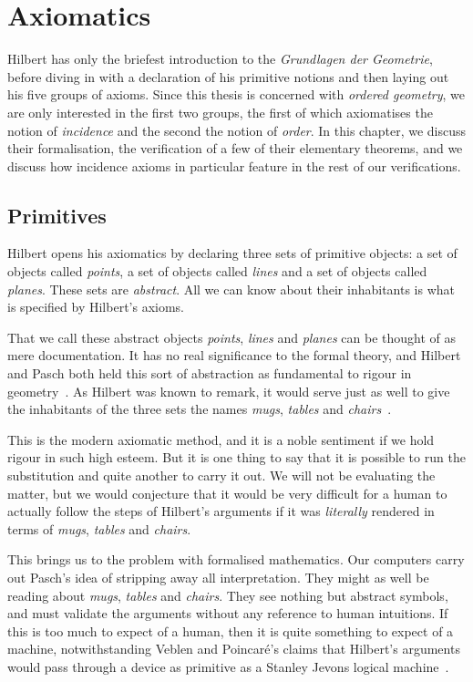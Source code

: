 \chapter{Axiomatics}\label{chapter:Axiomatics}
Hilbert has only the briefest introduction to the \emph{Grundlagen der Geometrie}, before diving in with a declaration of his primitive notions and then laying out his five groups of axioms. Since this thesis is concerned with \emph{ordered geometry}, we are only interested in the first two groups, the first of which axiomatises the notion of \emph{incidence} and the second the notion of \emph{order}. In this chapter, we discuss their formalisation, the verification of a few of their elementary theorems, and we discuss how incidence axioms in particular feature in the rest of our verifications.

\section{Primitives}
Hilbert opens his axiomatics by declaring three sets of primitive objects: a set of objects called \emph{points}, a set of objects called \emph{lines} and a set of objects called \emph{planes}. These sets are \emph{abstract}. All we can know about their inhabitants is what is specified by Hilbert's axioms.

That we call these abstract objects \emph{points}, \emph{lines} and \emph{planes} can be thought of as mere documentation. It has no real significance to the formal theory, and Hilbert and Pasch both held this sort of abstraction as fundamental to rigour in geometry~\cite{TableChairMug}. As Hilbert was known to remark, it would serve just as well to give the inhabitants of the three sets the names \emph{mugs}, \emph{tables} and \emph{chairs}~\cite{PaschToPeano}.

This is the modern axiomatic method, and it is a noble sentiment if we hold rigour in such high esteem. But it is one thing to say that it is possible to run the substitution and quite another to carry it out. We will not be evaluating the matter, but we would conjecture that it would be very difficult for a human to actually follow the steps of Hilbert's arguments if it was \emph{literally} rendered in terms of \emph{mugs}, \emph{tables} and \emph{chairs}.

This brings us to the problem with formalised mathematics. Our computers carry out Pasch's idea of stripping away all interpretation. They might as well be reading about \emph{mugs}, \emph{tables} and \emph{chairs}. They see nothing but abstract symbols, and must validate the arguments without any reference to human intuitions. If this is too much to expect of a human, then it is quite something to expect of a machine, notwithstanding Veblen and Poincar\'{e}'s claims that Hilbert's arguments would pass through a device as primitive as a Stanley Jevons logical machine~\cite{PoincareReview,VeblenHilbertReview}.


